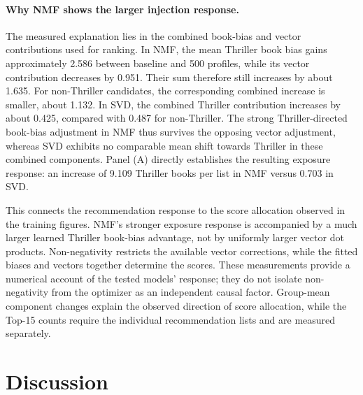 \documentclass[information,article,submit,pdftex,moreauthors]{Definitions/mdpi}
\newif\ifrevisionnotes
\newcommand{\saracomment}[1]{\ifrevisionnotes\par\smallskip\noindent\textcolor{orange}{\textbf{Sara:} #1}\par\smallskip\fi}
\begin{document}
\paragraph{Why NMF shows the larger injection response.}
The measured explanation lies in the combined book-bias and vector contributions used for ranking. In NMF, the mean Thriller book bias gains approximately 2.586 between baseline and 500 profiles, while its vector contribution decreases by 0.951. Their sum therefore still increases by about 1.635. For non-Thriller candidates, the corresponding combined increase is smaller, about 1.132. In SVD, the combined Thriller contribution increases by about 0.425, compared with 0.487 for non-Thriller. The strong Thriller-directed book-bias adjustment in NMF thus survives the opposing vector adjustment, whereas SVD exhibits no comparable mean shift towards Thriller in these combined components. Panel (A) directly establishes the resulting exposure response: an increase of 9.109 Thriller books per list in NMF versus 0.703 in SVD.

This connects the recommendation response to the score allocation observed in the training figures. NMF's stronger exposure response is accompanied by a much larger learned Thriller book-bias advantage, not by uniformly larger vector dot products. Non-negativity restricts the available vector corrections, while the fitted biases and vectors together determine the scores. These measurements provide a numerical account of the tested models' response; they do not isolate non-negativity from the optimizer as an independent causal factor. Group-mean component changes explain the observed direction of score allocation, while the Top-15 counts require the individual recommendation lists and are measured separately.

\saracomment{Added the uploaded five-panel original-user prediction figure. Verified all displayed doses against the source recommendation table: SVD remains slightly ahead at 25 profiles, and NMF is ahead from the next measured level, 50, through 500. Explained every panel, equal-user averaging, fixed within-user offsets and the complete 500-profile score decomposition. The larger NMF response is interpreted using the combined fitted bias and vector changes, with recommendation counts measured directly rather than inferred from genre means.}


\section{Discussion}
\label{sec:discussion}
\label{sec:cross-domain}
\end{document}
